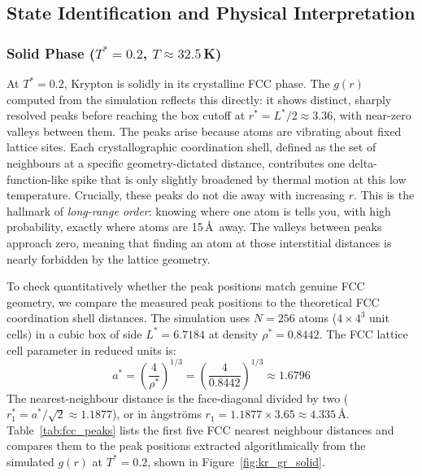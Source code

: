 \subsection{State Identification and Physical Interpretation}

\subsubsection{Solid Phase ($T^* = 0.2$, $T \approx 32.5$\,K)}
At $T^* = 0.2$, Krypton is solidly in its crystalline FCC phase. The $g(r)$ computed from the simulation reflects this directly: it shows distinct, sharply resolved peaks before reaching the box cutoff at $r^* = L^*/2 \approx 3.36$, with near-zero valleys between them.
The peaks arise because atoms are vibrating about fixed lattice sites. Each crystallographic coordination shell, defined as the set of neighbours at a specific geometry-dictated distance, contributes one delta-function-like spike that is only slightly broadened by thermal motion at this low temperature. Crucially, these peaks do not die away with increasing $r$. This is the hallmark of \emph{long-range order}: knowing where one atom is tells you, with high probability, exactly where atoms are 15\,\AA\ away. The valleys between peaks approach zero, meaning that finding an atom at those interstitial distances is nearly forbidden by the lattice geometry.

To check quantitatively whether the peak positions match genuine FCC geometry, we compare the measured peak positions to the theoretical FCC coordination shell distances. The simulation uses $N = 256$ atoms ($4 \times 4^3$ unit cells) in a cubic box of side $L^* = 6.7184$ at density $\rho^* = 0.8442$. The FCC lattice cell parameter in reduced units is:
\begin{equation}
    a^* = \left(\frac{4}{\rho^*}\right)^{1/3} = \left(\frac{4}{0.8442}\right)^{1/3} \approx 1.6796
    \label{eq:fcc_lat}
\end{equation}
The nearest-neighbour distance is the face-diagonal divided by two ($r^*_1 = a^*/\sqrt{2} \approx 1.1877$), or in ångströms $r_1 = 1.1877 \times 3.65 \approx 4.335$\,\AA. Table~\ref{tab:fcc_peaks} lists the first five FCC nearest neighbour distances and compares them to the peak positions extracted algorithmically from the simulated $g(r)$ at $T^* = 0.2$, shown in Figure~\ref{fig:kr_gr_solid}.

